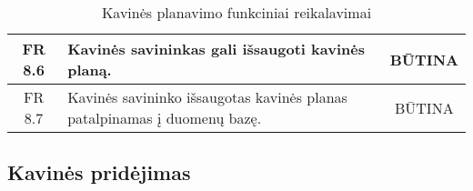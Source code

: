 \documentclass{VUMIFPSkursinis}
\begin{document}
\begin{center}
\begin{table}[H]
\begin{tabular}{|p{2cm}|p{}|p{}|}
		\multicolumn{1}{|c|}{FR 8.6}&
		{Kavinės savininkas gali išsaugoti kavinės planą.}&
		\multicolumn{1}{|c|}{BŪTINA}\\				
	\hline
	
		\multicolumn{1}{|c|}{FR 8.7}&
		{Kavinės savininko išsaugotas kavinės planas patalpinamas į duomenų bazę.}&
		\multicolumn{1}{|c|}{BŪTINA}\\				
	\hline
	
	\end{tabular}
	\caption{Kavinės planavimo funkciniai reikalavimai}
	\label{table:KavinėsPlanavimas}
	\end{table}
	
	
\end{center}

\pagebreak

\subsection{Kavinės pridėjimas}
\end{document}
